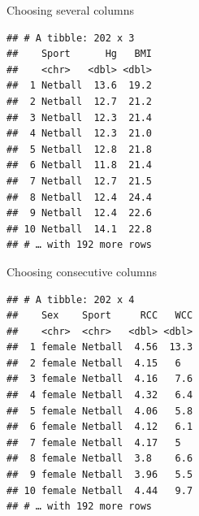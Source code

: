 \documentclass[
  ignorenonframetext,
]{beamer}
\newenvironment{Shaded}{\begin{snugshade}}{\end{snugshade}}
\newcommand{\KeywordTok}[1]{\textcolor[rgb]{0.13,0.29,0.53}{\textbf{#1}}}
\newcommand{\NormalTok}[1]{#1}
\newcommand{\OperatorTok}[1]{\textcolor[rgb]{0.81,0.36,0.00}{\textbf{#1}}}
\newcommand{\StringTok}[1]{\textcolor[rgb]{0.31,0.60,0.02}{#1}}
\begin{document}
\begin{frame}[fragile]{Choosing several columns}
\protect\hypertarget{choosing-several-columns}{}

\begin{Shaded}
\end{Shaded}

\begin{verbatim}
## # A tibble: 202 x 3
##    Sport      Hg   BMI
##    <chr>   <dbl> <dbl>
##  1 Netball  13.6  19.2
##  2 Netball  12.7  21.2
##  3 Netball  12.3  21.4
##  4 Netball  12.3  21.0
##  5 Netball  12.8  21.8
##  6 Netball  11.8  21.4
##  7 Netball  12.7  21.5
##  8 Netball  12.4  24.4
##  9 Netball  12.4  22.6
## 10 Netball  14.1  22.8
## # … with 192 more rows
\end{verbatim}

\end{frame}

\begin{frame}[fragile]{Choosing consecutive columns}
\protect\hypertarget{choosing-consecutive-columns}{}

\begin{Shaded}
\end{Shaded}

\begin{verbatim}
## # A tibble: 202 x 4
##    Sex    Sport     RCC   WCC
##    <chr>  <chr>   <dbl> <dbl>
##  1 female Netball  4.56  13.3
##  2 female Netball  4.15   6  
##  3 female Netball  4.16   7.6
##  4 female Netball  4.32   6.4
##  5 female Netball  4.06   5.8
##  6 female Netball  4.12   6.1
##  7 female Netball  4.17   5  
##  8 female Netball  3.8    6.6
##  9 female Netball  3.96   5.5
## 10 female Netball  4.44   9.7
## # … with 192 more rows
\end{verbatim}

\end{frame}
\end{document}
